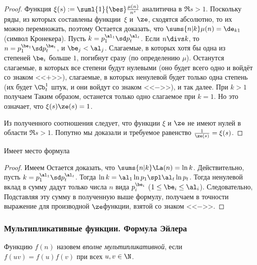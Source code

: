 \documentclass[a4paper]{article}
\begin{document}
\begin{proof}
Функция $\xi(s):=\suml{1}{\bes}\frac{\mu(n)}{n^s}$ аналитична в $\Re s>1$. Поскольку ряды, из которых
составлены функции~$\xi$ и~$\ze$, сходятся абсолютно, то их можно перемножать, поэтому
Остается доказать, что $\sums{n|k}\mu(n)=\de_{k1}$ (символ Кронекера).
Пусть $k=p_1^{\al_1}\sd p_t^{\al_t}$. Если $n\divs k$, то
${n=p_1^{\be_1}\sd p_t^{\be_t}}$, и $\be_j<\al_j$. Слагаемые, в которых хотя бы одна из степеней $\be_i$ больше $1$,
погибнут сразу (по определению $\mu$). Останутся слагаемые, в которых все степени будут нулевыми (оно будет
всего одно и войдёт со знаком <<$+$>>), слагаемые, в которых ненулевой будет только одна степень (их будет
$\Cb_t^1$ штук, и они войдут со знаком <<$-$>>), и так далее. При $k > 1$ получаем
Таким образом, останется только одно слагаемое при $k=1$. Но это означает, что
$\xi(s) \ze(s) = 1$.

Из полученного соотношения следует, что функции $\xi$ и $\ze$ не имеют нулей в области $\Re s > 1$.
Попутно мы доказали и требуемое равенство $\frac1{\ze(s)} = \xi(s)$.
\end{proof}

\begin{stm}
Имеет место формула
\end{stm}
\begin{proof}
Имеем
Остается доказать, что $\sums{n|k}\La(n)=\ln k$. Действительно, пусть
$k=p_1^{\al_1}\sd p_t^{\al_t}$. Тогда $\ln k = \al_1\ln p_1\spl \al_t \ln p_t$.
Тогда ненулевой вклад в сумму дадут только числа $n$ вида $p_i^{\be_i}$ ($1 \le \be_i \le \al_i$).
Следовательно,
Подставляя эту сумму в полученную выше формулу, получаем в точности выражение для производной $\ze$\д функции,
взятой со знаком <<$-$>>.
\end{proof}


\subsubsection{Мультипликативные функции. Формула Эйлера}

\begin{df}
Функцию $f(n)$ назовем \emph{вполне мультипликативной}, если $f(uv)=f(u)f(v)$ при всех $u,v\in\N$.
\end{df}
\end{document}
